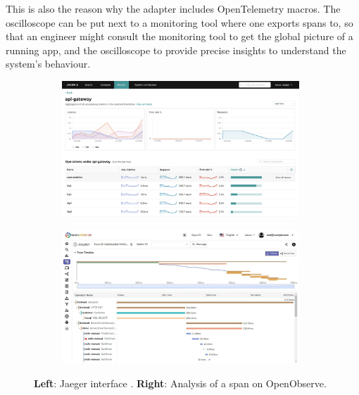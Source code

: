         This is also the reason why the adapter includes OpenTelemetry macros. The oscilloscope can be put next to a monitoring tool where one exports spans to, so that an engineer might consult the monitoring tool to get the global picture of a running app, and the oscilloscope to provide precise insights to understand the system's behaviour. 
       \begin{figure}[H]
            \centering
            \begin{subfigure}{.5\textwidth}
                \centering
                \includegraphics[width=0.98\textwidth]{img/jaeger.png}
                \label{fig:jag}
            \end{subfigure}%
            \begin{subfigure}{.5\textwidth}
                \centering
                \includegraphics[width =0.98\textwidth]{img/jaeger2.jpg}
                \label{fig:openobs}
            \end{subfigure}
            \caption{\textbf{Left}: Jaeger interface \cite{otel-p}. \textbf{Right}: Analysis of a span on OpenObserve. \cite{tr-e}}
            \label{fig:monitor}
            \end{figure}

